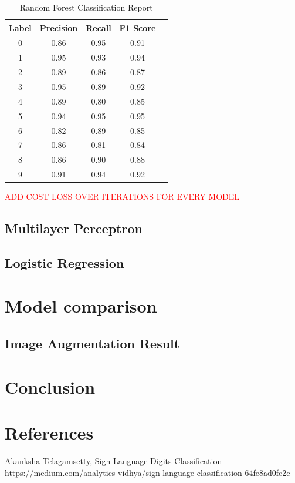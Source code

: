 \documentclass[conference]{IEEEtran}
\begin{document}
\begin{table}[!h]
    \centering
    \begin{tabular}{|c|c|c|c|r|}
        \hline
        \textbf{Label} & \textbf{Precision} & \textbf{Recall} & \textbf{F1 Score} \\ \hline
        0              & 0.86               & 0.95            & 0.91              \\ \hline
        1              & 0.95               & 0.93            & 0.94              \\ \hline
        2              & 0.89               & 0.86            & 0.87              \\ \hline
        3              & 0.95               & 0.89            & 0.92              \\ \hline
        4              & 0.89               & 0.80            & 0.85              \\ \hline
        5              & 0.94               & 0.95            & 0.95              \\ \hline
        6              & 0.82               & 0.89            & 0.85              \\ \hline
        7              & 0.86               & 0.81            & 0.84              \\ \hline
        8              & 0.86               & 0.90            & 0.88              \\ \hline
        9              & 0.91               & 0.94            & 0.92              \\ \hline
    \end{tabular}
    \label{tab:rfc_classification_report}
    \caption{Random Forest Classification Report}
\end{table}

\textcolor{red}{ADD COST LOSS OVER ITERATIONS FOR EVERY MODEL}

\subsection{Multilayer Perceptron}

\subsection{Logistic Regression}

\section{Model comparison}

\subsection{Image Augmentation Result}
\section{Conclusion}

\section{References}

\begin{thebibliography}{00}
     Akanksha Telagamsetty, Sign Language Digits Classification https://medium.com/analytics-vidhya/sign-language-classification-64fe8ad0fc2c
\end{thebibliography}
\end{document}
